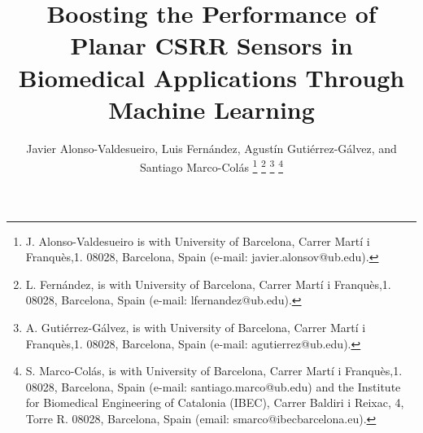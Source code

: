 \documentclass[journal,twoside,web]{ieeecolor}
\begin{document}
\title{Boosting the Performance of Planar CSRR Sensors in Biomedical Applications Through Machine Learning}
\author{Javier Alonso-Valdesueiro, Luis Fernández, Agustín Gutiérrez-Gálvez, and Santiago Marco-Colás
\thanks{J. Alonso-Valdesueiro is with University of Barcelona, Carrer Martí i Franquès,1. 08028, Barcelona, Spain (e-mail: javier.alonsov@ub.edu). }
\thanks{L. Fernández, is with University of Barcelona, Carrer Martí i Franquès,1. 08028, Barcelona, Spain (e-mail: lfernandez@ub.edu).}
\thanks{A. Gutiérrez-Gálvez, is with University of Barcelona, Carrer Martí i Franquès,1. 08028, Barcelona, Spain (e-mail: agutierrez@ub.edu).}
\thanks{S. Marco-Colás, is with University of Barcelona, Carrer Martí i Franquès,1. 08028, Barcelona, Spain (e-mail: santiago.marco@ub.edu) and the Institute for Biomedical Engineering of Catalonia (IBEC), Carrer Baldiri i Reixac, 4, Torre R. 08028, Barcelona, Spain (email: smarco@ibecbarcelona.eu).}}
\end{document}
